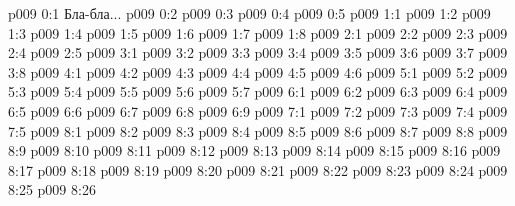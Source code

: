 \author{Божественный Советник}
\vs p009 0:1  Бла-бла...
\vs p009 0:2 \pc 
\vs p009 0:3 
\vs p009 0:4 
\vs p009 0:5 \pc 
{}
\vs p009 1:1 
\vs p009 1:2 
\vs p009 1:3 \pc 
\vs p009 1:4 \pc 
\vs p009 1:5 \pc 
\vs p009 1:6 
\vs p009 1:7 \pc 
\vs p009 1:8 
\vs p009 2:1 
\vs p009 2:2 
\vs p009 2:3 
\vs p009 2:4 
\vs p009 2:5 
\vs p009 3:1 
\vs p009 3:2 \pc 
\vs p009 3:3 \pc 
\vs p009 3:4 
\vs p009 3:5 \pc 
\vs p009 3:6 
\vs p009 3:7 
\vs p009 3:8 
\vs p009 4:1 
\vs p009 4:2 
\vs p009 4:3 \pc 
\vs p009 4:4 
\vs p009 4:5 \pc 
\vs p009 4:6 
\vs p009 5:1 
\vs p009 5:2 
\vs p009 5:3 
\vs p009 5:4 \pc 
\vs p009 5:5 \pc 
\vs p009 5:6 
\vs p009 5:7 
\vs p009 6:1 
\vs p009 6:2 
\vs p009 6:3 \pc 
\vs p009 6:4 \pc 
\vs p009 6:5 
\vs p009 6:6 \pc 
\vs p009 6:7 
\vs p009 6:8 \pc 
\vs p009 6:9 \pc 
{}
\vs p009 7:1 
\vs p009 7:2 
\vs p009 7:3 
\vs p009 7:4 \pc 
\vs p009 7:5 
\vs p009 8:1 
\vs p009 8:2 
\vs p009 8:3 
\vs p009 8:4 
\vs p009 8:5 
\vs p009 8:6 \pc 
\vs p009 8:7 
\vs p009 8:8 
\vs p009 8:9 \pc 
\vs p009 8:10 \pc 
\vs p009 8:11 \pc 
\vs p009 8:12 
\vs p009 8:13 
\vs p009 8:14 \pc 
\vs p009 8:15 
\vs p009 8:16 
\vs p009 8:17 
\vs p009 8:18 
\vs p009 8:19 
\vs p009 8:20 
\vs p009 8:21 
\vs p009 8:22 
\vs p009 8:23 
\vs p009 8:24 
\vs p009 8:25 
\vsetoff
\vs p009 8:26 
\quizlink
